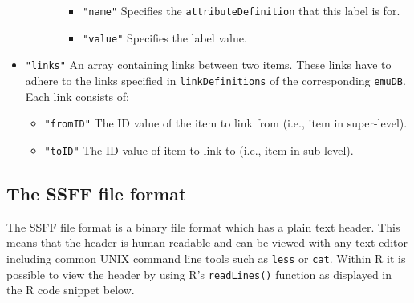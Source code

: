 \documentclass[]{book}
\theoremstyle{definition}
\theoremstyle{definition}
\theoremstyle{definition}
\theoremstyle{remark}
\begin{document}
\begin{itemize}
\begin{itemize}
\begin{itemize}
      \begin{itemize}
      \item
        \texttt{"name"} Specifies the \texttt{attributeDefinition} that
        this label is for.
      \item
        \texttt{"value"} Specifies the label value.
      \end{itemize}
    \end{itemize}
  \end{itemize}
\item
  \texttt{"links"} An array containing links between two items. These
  links have to adhere to the links specified in
  \texttt{linkDefinitions} of the corresponding \texttt{emuDB}. Each
  link consists of:

  \begin{itemize}
  \item
    \texttt{"fromID"} The ID value of the item to link from (i.e., item
    in super-level).
  \item
    \texttt{"toID"} The ID value of item to link to (i.e., item in
    sub-level).
  \end{itemize}
\end{itemize}

\hypertarget{subsec:app-chapFileFormatsSSFF}{%
\subsection{The SSFF file format}\label{subsec:app-chapFileFormatsSSFF}}

The SSFF file format is a binary file format which has a plain text
header. This means that the header is human-readable and can be viewed
with any text editor including common UNIX command line tools such as
\texttt{less} or \texttt{cat}. Within R it is possible to view the
header by using R's \texttt{readLines()} function as displayed in the R
code snippet below.
\end{document}
